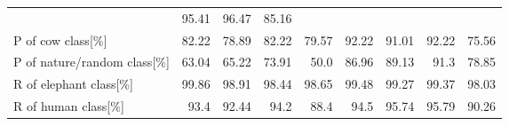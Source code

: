 \begin{table}[!htbp]
{\begin{tabular}{lrrrrrrrr}
                                        & \cellcolor{tbyellow} 95.41 
                                        & \cellcolor{tbgreeny} 96.47
                                        & \cellcolor{tbred}    85.16 \\
        P of cow class[\%]              & \cellcolor{tbyellow} 82.22 
                                        & \cellcolor{tbyellow} 78.89 
                                        & \cellcolor{tbyellow} 82.22 
                                        & \cellcolor{tbyellow} 79.57 
                                        & \cellcolor{tbgreen}  92.22 
                                        & \cellcolor{tbgreeny} 91.01 
                                        & \cellcolor{tbgreen}  92.22 
                                        & \cellcolor{tbred}    75.56 \\
        P of nature/random class[\%]    & \cellcolor{tbyellow} 63.04 
                                        & \cellcolor{tbyellow} 65.22 
                                        & \cellcolor{tbyellow} 73.91 
                                        & \cellcolor{tbred}    50.0  
                                        & \cellcolor{tbgreeny} 86.96 
                                        & \cellcolor{tbgreeny} 89.13 
                                        & \cellcolor{tbgreen}  91.3 
                                        & \cellcolor{tbyellow} 78.85 \\\midrule
        R of elephant class[\%]         & \cellcolor{tbgreen}  99.86 
                                        & \cellcolor{tbyellow} 98.91 
                                        & \cellcolor{tbyellow} 98.44 
                                        & \cellcolor{tbyellow} 98.65 
                                        & \cellcolor{tbgreeny} 99.48 
                                        & \cellcolor{tbgreeny} 99.27 
                                        & \cellcolor{tbgreeny} 99.37 
                                        & \cellcolor{tbred}    98.03 \\
        R of human class[\%]            & \cellcolor{tbyellow} 93.4  
                                        & \cellcolor{tbyellow} 92.44 
                                        & \cellcolor{tbgreeny} 94.2  
                                        & \cellcolor{tbred}    88.4  
                                        & \cellcolor{tbgreeny} 94.5  
                                        & \cellcolor{tbgreen}  95.74 
                                        & \cellcolor{tbgreen}  95.79 
                                        & \cellcolor{tbyellow} 90.26 \\

\end{tabular}}
\end{table}
